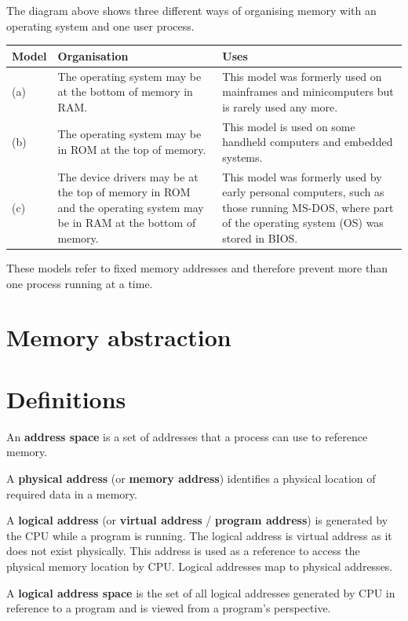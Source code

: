 \documentclass[a4paper]{systems-software}
\begin{document}
The diagram above shows three different ways of organising memory with an operating system and one user process.

\begin{longtabu} to \textwidth {| X[1,l] | X[6,l] | X[6,l] | }
    \hline
    \textbf{Model} & \textbf{Organisation} & \textbf{Uses} 
	\\ \hline
	(a) & The operating system may be at the bottom of memory in RAM.
	& This model was formerly used on mainframes and minicomputers but is rarely used any more.
	\\ \hline
	(b) & The operating system may be in ROM at the top of memory.
	& This model is used on some handheld computers and embedded systems. 
	\\ \hline
	(c) & The device drivers may be at the top of memory in ROM and the operating system may be in RAM at the bottom of memory.
	& This model was formerly used by early personal computers, such as those running MS-DOS, where part of the operating system (OS) was stored in BIOS.
	\\ \hline
\end{longtabu}

These models refer to fixed memory addresses and therefore prevent more than one process running at a time.


\section{Memory abstraction}

\section*{Definitions}

An \textbf{address space} is a set of addresses that a process can use to reference memory.

A \textbf{physical address} (or \textbf{memory address}) identifies a physical location of required data in a memory.

A \textbf{logical address} (or \textbf{virtual address} / \textbf{program address}) is generated by the CPU while a program is running. The logical address is virtual address as it does not exist physically. This address is used as a reference to access the physical memory location by CPU. Logical addresses map to physical addresses.

A \textbf{logical address space} is the set of all logical addresses generated by CPU in reference to a program and is viewed from a program's perspective.
\end{document}
